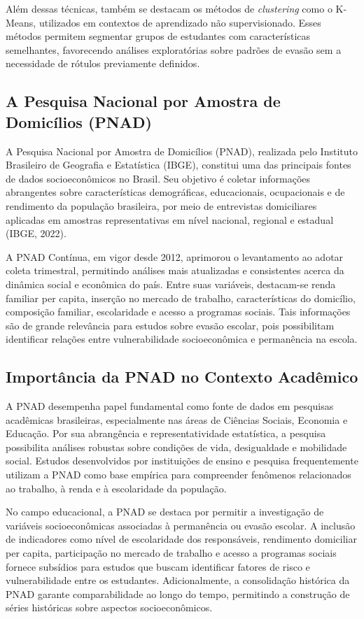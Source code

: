 \documentclass[english, spanish, brazilian]{RBIEarticle} %
\begin{document}
Além dessas técnicas, também se destacam os métodos de \textit{clustering} como o K-Means, utilizados em contextos de aprendizado não supervisionado. Esses métodos permitem segmentar grupos de estudantes com características semelhantes, favorecendo análises exploratórias sobre padrões de evasão sem a necessidade de rótulos previamente definidos.

\subsection{A Pesquisa Nacional por Amostra de Domicílios (PNAD)}
A Pesquisa Nacional por Amostra de Domicílios (PNAD), realizada pelo Instituto Brasileiro de Geografia e Estatística (IBGE), constitui uma das principais fontes de dados socioeconômicos no Brasil. Seu objetivo é coletar informações abrangentes sobre características demográficas, educacionais, ocupacionais e de rendimento da população brasileira, por meio de entrevistas domiciliares aplicadas em amostras representativas em nível nacional, regional e estadual (IBGE, 2022).

A PNAD Contínua, em vigor desde 2012, aprimorou o levantamento ao adotar coleta trimestral, permitindo análises mais atualizadas e consistentes acerca da dinâmica social e econômica do país. Entre suas variáveis, destacam-se renda familiar per capita, inserção no mercado de trabalho, características do domicílio, composição familiar, escolaridade e acesso a programas sociais. Tais informações são de grande relevância para estudos sobre evasão escolar, pois possibilitam identificar relações entre vulnerabilidade socioeconômica e permanência na escola.

\subsection{Importância da PNAD no Contexto Acadêmico}
A PNAD desempenha papel fundamental como fonte de dados em pesquisas acadêmicas brasileiras, especialmente nas áreas de Ciências Sociais, Economia e Educação. Por sua abrangência e representatividade estatística, a pesquisa possibilita análises robustas sobre condições de vida, desigualdade e mobilidade social. Estudos desenvolvidos por instituições de ensino e pesquisa frequentemente utilizam a PNAD como base empírica para compreender fenômenos relacionados ao trabalho, à renda e à escolaridade da população.

No campo educacional, a PNAD se destaca por permitir a investigação de variáveis socioeconômicas associadas à permanência ou evasão escolar. A inclusão de indicadores como nível de escolaridade dos responsáveis, rendimento domiciliar per capita, participação no mercado de trabalho e acesso a programas sociais fornece subsídios para estudos que buscam identificar fatores de risco e vulnerabilidade entre os estudantes. Adicionalmente, a consolidação histórica da PNAD garante comparabilidade ao longo do tempo, permitindo a construção de séries históricas sobre aspectos socioeconômicos.
\end{document}
